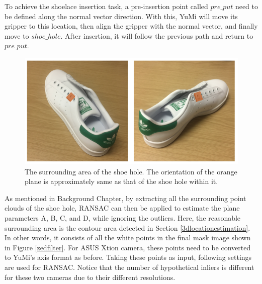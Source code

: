 To achieve the shoelace insertion task, a pre-insertion point called $pre\_put$ need to be defined along the normal vector direction. With this, YuMi will move its gripper to this location, then align the gripper with the normal vector, and finally move to $shoe\_hole$. After insertion, it will follow the previous path and return to $pre\_put$.

\begin{figure}[H]
\centering
\includegraphics[width = 0.7\columnwidth]{Implementation/cv/plane.png}
\caption{The surrounding area of the shoe hole. The orientation of the orange plane is approximately same as that of the shoe hole within it.}
\label{plane}
\end{figure}

As mentioned in Background Chapter, by extracting all the surrounding point clouds of the shoe hole, RANSAC can then be applied to estimate the plane parameters A, B, C, and D, while ignoring the outliers. Here, the reasonable surrounding area is the contour area detected in Section \ref{3dlocationestimation}. In other words, it consists of all the white points in the final mask image shown in Figure \ref{zedfilter}. For ASUS Xtion camera, these points need to be converted to YuMi's axis format as before. Taking these points as input, following settings are used for RANSAC. Notice that the number of hypothetical inliers is different for these two cameras due to their different resolutions.

\begin{table}[H]
\centering
{}
\caption{RANSAC parameters setting}
\label{ransacsetting}
\end{table}


